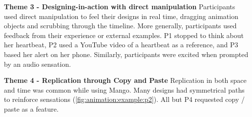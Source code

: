\textbf{Theme 3 - Designing-in-action with direct manipulation}
Participants used direct manipulation to feel their designs in real time, %
dragging animation objects %
and scrubbing through
the timeline.
More generally, participants used feedback from their experience or external examples.
P1 stopped to think about her heartbeat,  P2 used a YouTube video of a heartbeat as a reference, and P3 based her alert on her phone. %
Similarly, participants were excited when prompted by an audio sensation.



\textbf{Theme 4 - Replication through Copy and Paste}
Replication in both space and time was common while using Mango.
Many designs had symmetrical paths to reinforce sensations (\autoref{fig:animation:example:p2}).
All but P4 requested copy / paste as a feature.

